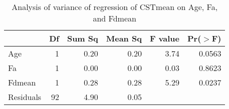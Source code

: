 \begin{table}[ht]
\centering
\caption{Analysis of variance of regression of CSTmean on Age, Fa, and Fdmean}
\label{tab:cstfa}
\begin{tabular}{lrrrrr}
  \hline
 & Df & Sum Sq & Mean Sq & F value & Pr($>$F) \\ 
  \hline
Age         & 1 & 0.20 & 0.20 & 3.74 & 0.0563 \\ 
  Fa          & 1 & 0.00 & 0.00 & 0.03 & 0.8623 \\ 
  Fdmean      & 1 & 0.28 & 0.28 & 5.29 & 0.0237 \\ 
  Residuals   & 92 & 4.90 & 0.05 &  &  \\ 
   \hline
\end{tabular}
\end{table}

